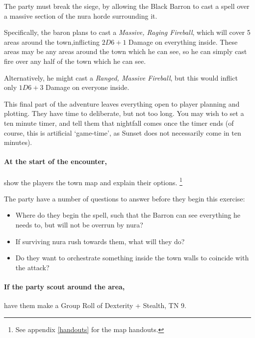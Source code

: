 \begin{multicols}{2}

\noindent
The party must break the siege, by allowing the Black Barron to cast a spell over a massive section of the nura horde surrounding it.

Specifically, the baron plans to cast a \textit{Massive, Raging Fireball}, which will cover 5 areas around the town,inflicting $2D6+1$ Damage on everything inside.
These areas may be any areas around the town which he can see, so he can simply cast fire over any half of the town which he can see.

Alternatively, he might cast a \textit{Ranged, Massive Fireball}, but this would inflict only $1D6 + 3$ Damage on everyone inside.

This final part of the adventure leaves everything open to player planning and plotting.
They have time to deliberate, but not too long.
You may wish to set a ten minute timer, and tell them that nightfall comes once the timer ends (of course, this is artificial `game-time', as Sunset does not necessarily come in ten minutes).

\paragraph{At the start of the encounter,}
show the players the town map and explain their options.%
\footnote{See appendix \ref{handouts} for the map handouts.}

The party have a number of questions to answer before they begin this exercise:

\begin{itemize}

	\item{Where do they begin the spell, such that the Barron can see everything he needs to, but will not be overrun by nura?}
	\item{If surviving nura rush towards them, what will they do?}
	\item{Do they want to orchestrate something inside the town walls to coincide with the attack?}

\end{itemize}

\paragraph{If the party scout around the area,}
have them make a Group Roll of Dexterity + Stealth, TN 9.

\setcounter{list}{-1}
\begin{list}{\addtocounter{list}{1}\textbf{Margin }:}{\raggedleft}


\end{list}
\end{multicols}
